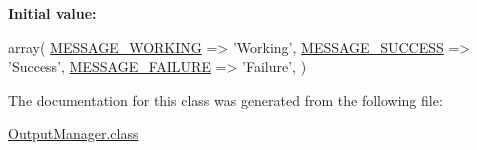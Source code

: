 {\bfseries Initial value\-:}
\begin{DoxyCode}
 array(
    \hyperlink{Messenger_8iface_a42a959808a10ab30584347844a7d1657}{MESSAGE\_WORKING} => \textcolor{stringliteral}{'Working'},
    \hyperlink{Messenger_8iface_a380502784d2fa316c3e079af391c3b05}{MESSAGE\_SUCCESS} => \textcolor{stringliteral}{'Success'},
    \hyperlink{Messenger_8iface_a7ffc56b0d4599e10d5f0e9e65f992dc1}{MESSAGE\_FAILURE} => \textcolor{stringliteral}{'Failure'},
  )
\end{DoxyCode}


The documentation for this class was generated from the following file\-:\begin{DoxyCompactItemize}
\item 
\hyperlink{OutputManager_8class}{Output\-Manager.\-class}\end{DoxyCompactItemize}
